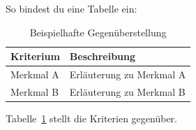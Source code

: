 So bindest du eine Tabelle ein:

\begin{table}[H]
  \centering
  \caption{Beispielhafte Gegenüberstellung}
  \label{tab:beispiel}
  \begin{tabularx}{\textwidth}{@{}lX@{}}
    \toprule
    \textbf{Kriterium} & \textbf{Beschreibung} \\
    \midrule
    Merkmal A & Erläuterung zu Merkmal A \\
    Merkmal B & Erläuterung zu Merkmal B \\
    \bottomrule
  \end{tabularx}
\end{table}

\noindent Tabelle~\ref{tab:beispiel} stellt die Kriterien gegenüber.
